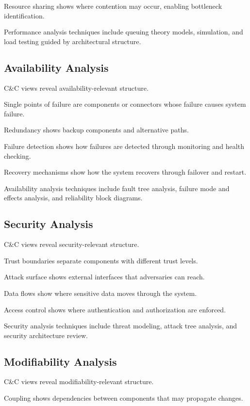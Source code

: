 \documentclass[11pt]{article}
\begin{document}
Resource sharing shows where contention may occur, enabling bottleneck identification.

Performance analysis techniques include queuing theory models, simulation, and load testing guided by architectural structure.

\subsection{Availability Analysis}

C\&C views reveal availability-relevant structure.

Single points of failure are components or connectors whose failure causes system failure.

Redundancy shows backup components and alternative paths.

Failure detection shows how failures are detected through monitoring and health checking.

Recovery mechanisms show how the system recovers through failover and restart.

Availability analysis techniques include fault tree analysis, failure mode and effects analysis, and reliability block diagrams.

\subsection{Security Analysis}

C\&C views reveal security-relevant structure.

Trust boundaries separate components with different trust levels.

Attack surface shows external interfaces that adversaries can reach.

Data flows show where sensitive data moves through the system.

Access control shows where authentication and authorization are enforced.

Security analysis techniques include threat modeling, attack tree analysis, and security architecture review.

\subsection{Modifiability Analysis}

C\&C views reveal modifiability-relevant structure.

Coupling shows dependencies between components that may propagate changes.
\end{document}
